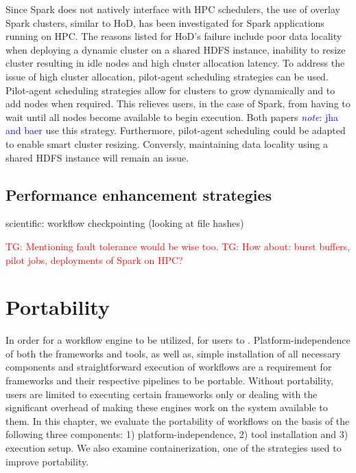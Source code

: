 \documentclass{report}
\newcommand{\note}[1]{\textcolor{blue}{\textit{note}: #1}}
\newcommand{\tristan}[1]{\textcolor{red}{TG: #1}}
\newcommand{\weird}[1]{\uwave{#1}}
\begin{document}
            Since Spark does not natively interface with HPC schedulers, 
            the use of overlay Spark clusters, similar to HoD, has been 
            investigated for Spark applications running on HPC. The reasons 
            listed for HoD's failure include poor 
            data locality when deploying a dynamic cluster on a shared HDFS 
            instance, inability to resize cluster resulting in idle nodes and 
            high cluster allocation latency. To address the issue of high 
            cluster allocation, pilot-agent scheduling strategies can be used.
            Pilot-agent scheduling strategies allow for clusters to grow 
            dynamically and to add nodes when required. This relieves users, 
            in the case of Spark, from having to wait until all nodes become 
            available to begin execution. Both papers \note{jha and baer} use 
            this strategy. Furthermore, pilot-agent scheduling could be adapted
            to enable smart cluster resizing. Conversly, maintaining data 
            locality using a shared HDFS instance will remain an issue. 

        \section{Performance enhancement strategies}\label{other}
            scientific: workflow checkpointing (looking at file hashes)
            
            \tristan{Mentioning fault tolerance would be wise too.}
            \tristan{How about: burst buffers, pilot jobs, deployments of Spark on HPC?}
            
    \chapter{Portability}\label{portability}
        In order for a workflow engine to be utilized, \weird{it much be simple} for 
        users to \weird{install and execute the data}. Platform-independence of both 
        the frameworks and tools, as well as, simple installation of all 
        necessary components and straightforward execution of workflows  are a 
        requirement for frameworks and their respective pipelines to be 
        portable. Without portability, users are limited to executing certain
        frameworks only or dealing with the significant overhead of making 
        these engines work on the system available to them. In this chapter, 
        we evaluate the portability of workflows on the basis of the following
        three components: 1) platform-independence, 2) tool installation and
        3) execution setup. We also examine containerization, one of the 
        strategies used to improve portability.
\end{document}
